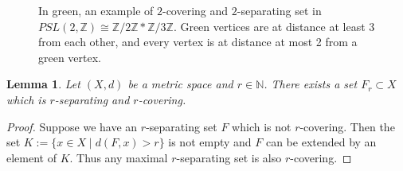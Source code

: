 \documentclass[letterpaper]{article}
\theoremstyle{plain}
\newtheorem{lemma}[theorem]{Lemma}
\def\NN{\mathbb{N}}
\def\ZZ{\mathbb{Z}}
\newcommand{\cor}[2][]{#2}
\begin{document}
	\begin{figure}[!ht]
		\centering
		
		\caption{In green, an example of $2$-covering and $2$-separating set in $PSL(2,\ZZ) \cong \ZZ/2\ZZ \ast \ZZ/3 \ZZ$. Green vertices are at distance at least 3 from each other, and every vertex is at distance at most 2 from a green vertex.}
		\label{figure.hierarchical_decomposition_PSL2Z_bis}
	\end{figure}
		
	\begin{lemma}\label{Lemmametricspacedecomposition}
		Let $(X,d)$ be a metric space and $r \in \NN$. There exists a set $F_r \subset X$ which is $r$-separating and $r$-covering. 
	\end{lemma}
	
	\begin{proof}
		Suppose we have \cor[a]{an} $r$-separating set $F$ which is not $r$-covering. Then the set $K := \{x \in X \mid d(F,x)>r\}$ is not empty and $F$ can be extended by an element of $K$. Thus any maximal $r$-separating set is also $r$-covering.
		

\end{proof}
\end{document}
